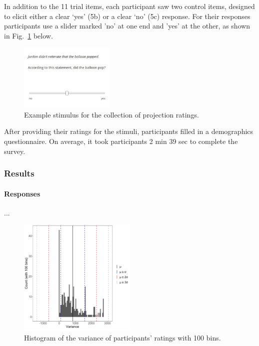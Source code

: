\documentclass[11pt,fleqn]{article}
\newcommand{\figref}[1]{Fig.~\ref{#1}}
\newcommand{\6}{\mbox{$[\hspace*{-.6mm}[$}}
\newcommand{\9}{\mbox{$]\hspace*{-.6mm}]$}}
\begin{document}
In addition to the 11 trial items, each participant saw two control items, designed to elicit either a clear `yes' (5b) or a clear `no' (5c) response. For their responses participants use a slider marked 'no' at one end and 'yes' at the other, as shown in \figref{exquest} below.

\begin{figure}[H]
	\centering
	\includegraphics[width=0.4\textwidth]{example-question}
	\caption{Example stimulus for the collection of projection ratings.}
	\label{exquest}
\end{figure}

After providing their ratings for the stimuli, participants filled in a demographics questionnaire. On average, it took participants 2 min 39 sec to complete the survey.


\subsubsection{Results}

\paragraph{Responses}

...

\begin{figure}[H]
	\centering
	\includegraphics[width=0.5\textwidth]{variances}
	\caption{Histogram of the variance of participants' ratings with 100 bins.}
	\label{variances}
\end{figure}
\end{document}
